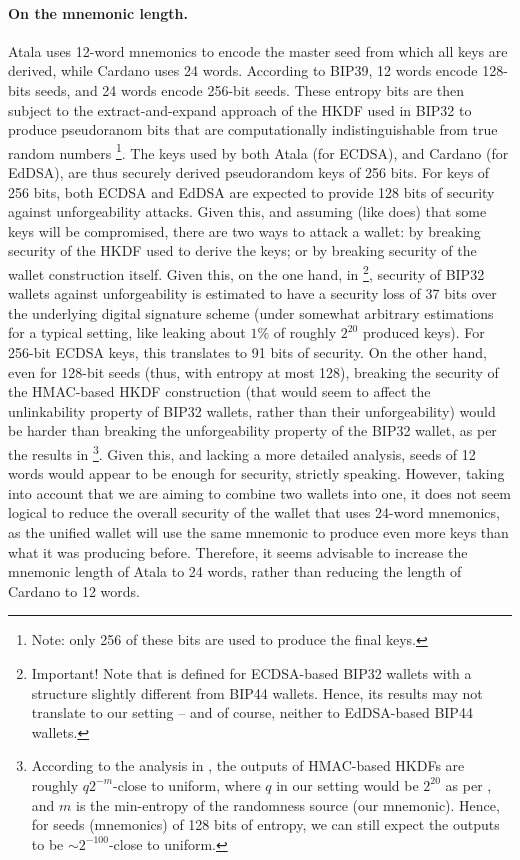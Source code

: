 \paragraph{On the mnemonic length.} %
Atala uses 12-word mnemonics to encode the master seed from which all keys are
derived, while Cardano uses 24 words. According to BIP39, 12 words encode 128-bits
seeds, and 24 words encode 256-bit seeds. These entropy bits are then subject to
the extract-and-expand approach of the HKDF used in BIP32 to produce pseudoranom
bits that are computationally indistinguishable from true random numbers%
\footnote{Note: only 256 of these bits are used to produce the final keys.}.
The keys used by both Atala (for ECDSA), and Cardano (for EdDSA), are thus
securely derived pseudorandom keys of 256 bits. For keys of 256 bits, both ECDSA
and EdDSA are expected to provide 128 bits of security against unforgeability
attacks. Given this, and assuming (like \cite{def+21} does) that some keys
will be compromised, there are two ways to attack a wallet: by breaking
security of the HKDF used to derive the keys; or by breaking security of
the wallet construction itself. Given this, on the one hand, in \cite{def+21}%
\footnote{Important! Note that \cite{def+21} is defined for ECDSA-based BIP32
  wallets with a structure slightly different from BIP44 wallets. Hence, its
  results may not translate to our setting -- and of course, neither to
  EdDSA-based BIP44 wallets.}, security of BIP32 wallets against unforgeability
is estimated to have a security loss of 37 bits over the underlying digital
signature scheme (under somewhat arbitrary estimations for
a typical setting, like leaking about $1\%$ of roughly $2^{20}$ produced
keys). For 256-bit ECDSA keys, this translates to 91 bits of security.
On the other hand, even for 128-bit seeds (thus, with entropy at most
128), breaking the security of the HMAC-based HKDF construction (that would
seem to affect the unlinkability property of BIP32 wallets, rather than their
unforgeability) would be harder than breaking the unforgeability property of
the BIP32 wallet, as per the results in \cite{kraw10}\footnote{According to the
  analysis in \cite{kraw10}, the outputs of HMAC-based HKDFs are roughly
  $q2^{-m}$-close to uniform, where $q$ in our setting would be $2^{20}$ as per
  \cite{def+21}, and $m$ is the min-entropy of the randomness source (our
  mnemonic). Hence, for seeds (mnemonics) of 128 bits of entropy, we can still
  expect the outputs to be $\sim 2^{-100}$-close to uniform.}. Given this, and
lacking a more detailed analysis, seeds of 12 words would appear to be enough
for security, strictly speaking. However, taking into account that we are
aiming to combine two wallets into one, it does not seem logical to reduce the
overall security of the wallet that uses 24-word mnemonics, as the unified
wallet will use the same mnemonic to produce even more keys than what it
was producing before. Therefore, it seems advisable to increase the mnemonic
length of Atala to 24 words, rather than reducing the length of Cardano to
12 words.

